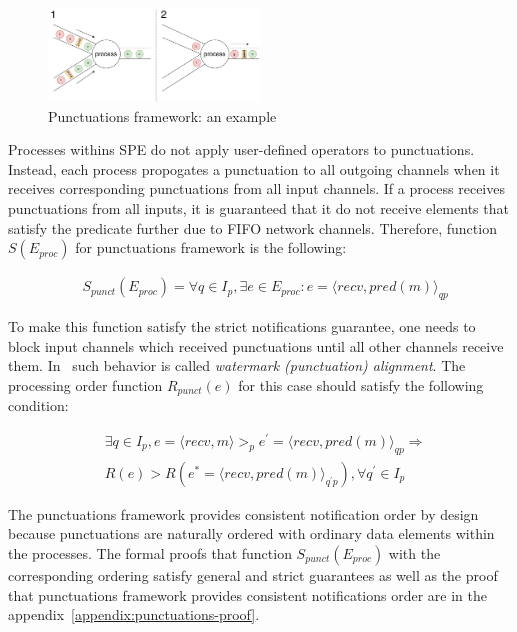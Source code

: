 \begin{figure}[htbp]
  \centering
  \includegraphics[width=0.50\textwidth]{pics/punctuations-scheme.pdf}
  \caption{Punctuations framework: an example}
  \label{punctuations_scheme}
\end{figure}

Processes withins SPE do not apply user-defined operators to punctuations. Instead, each process propogates a punctuation to all outgoing channels when it receives corresponding punctuations from all input channels. If a process receives punctuations from all inputs, it is guaranteed that it do not receive elements that satisfy the predicate further due to FIFO network channels. Therefore, function $S(E_{proc})$ for punctuations framework is the following:

\begin{align*}
& S_{punct}(E_{proc}) = \forall q \in I_p, \exists e \in E_{proc} : e = \langle recv,pred(m)\rangle_{qp}
\end{align*}

To make this function satisfy the strict notifications guarantee, one needs to block input channels which received punctuations until all other channels receive them. In~\cite{Carbone:2017:SMA:3137765.3137777} such behavior is called {\em watermark (punctuation) alignment}. The processing order function $R_{punct}(e)$ for this case should satisfy the following condition:

\begin{align*}
& \exists q \in I_p, e = \langle recv,m \rangle >_p e^{'} = \langle recv,pred(m)\rangle_{qp} \Longrightarrow \\ 
& R(e) > R(e^{*}= \langle recv,pred(m) \rangle_{q^{'}p}), \forall q^{'} \in I_p
\end{align*}

The punctuations framework provides consistent notification order by design because punctuations are naturally ordered with ordinary data elements within the processes. The formal proofs that function $S_{punct}(E_{proc})$ with the corresponding ordering satisfy general and strict guarantees as well as the proof that punctuations framework provides consistent notifications order are in the appendix~\ref{appendix:punctuations-proof}.

